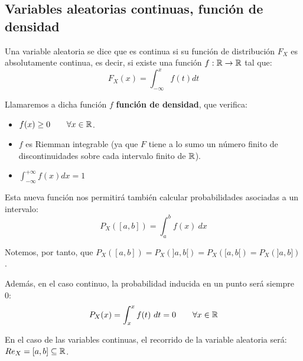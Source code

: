 \subsection{Variables aleatorias continuas, función de densidad}

\begin{definicion}
    Una variable aleatoria se dice que es continua si su función de distribución $F_X$ es absolutamente continua, es decir, si existe una función $f:\mathbb R \rightarrow \mathbb R$ tal que:
    $$F_X(x) = \int_{-\infty}^x f(t) dt$$
\end{definicion}

Llamaremos a dicha función $f$ \textbf{función de densidad}, que verifica:
\begin{itemize}
  \item $f(x) \geq 0 \qquad \forall x \in \mathbb R$.
  \item $f$ es Riemman integrable (ya que $F$ tiene a lo sumo un número finito de discontinuidades sobre cada intervalo finito de $\mathbb R$).
  \item $\displaystyle \int_{-\infty}^{+\infty}f(x) dx = 1$
\end{itemize}

Esta nueva función nos permitirá también calcular probabilidades asociadas a un intervalo:
$$P_X([a,b]) = \int_a^b f(x)~dx$$

Notemos, por tanto, que $P_X([a,b]) = P_X(]a,b[) = P_X([a,b[) = P_X(]a,b])$.

Además, en el caso continuo, la probabilidad inducida en un punto será siempre~$0$:
$$P_X(x) = \int_x^x f(t)~dt = 0 \qquad \forall x \in \mathbb R$$

En el caso de las variables continuas, el recorrido de la variable aleatoria será: $Re_X = [a,b] \subseteq \mathbb R$.

